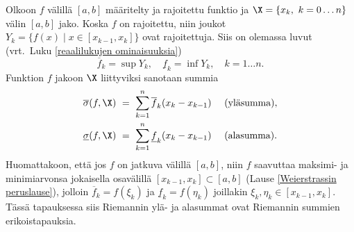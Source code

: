 Olkoon $f$ välillä $[a,b]$ määritelty ja rajoitettu funktio ja $\X = \{x_k,\ k = 0 \ldots n\}$
välin $[a,b]$ jako. Koska $f$ on rajoitettu, niin joukot 
$Y_k = \{f(x) \mid x \in [x_{k-1},x_k]\}$ ovat rajoitettuja. Siis on olemassa luvut 
(vrt.\ Luku \ref{reaalilukujen ominaisuuksia})
\[ 
\overline{f}_k = \sup Y_k, \quad \underline{f}_k = \inf Y_k, \quad k = 1 \ldots n.  
\]
Funktion $f$ jakoon $\X$ liittyviksi
%
 sanotaan summia
\begin{align*}
\overline{\sigma}(f,\X)\ 
          &=\ \sum_{k=1}^n \overline{f}_k (x_k-x_{k-1}) \quad\ \text{(yläsumma)}, \\
\underline{\sigma}(f,\X)\ 
          &=\ \sum_{k=1}^n \underline{f}_k (x_k-x_{k-1}) \quad\ \text{(alasumma)}. 
\end{align*}
Huomattakoon, että jos $f$ on jatkuva välillä $[a,b]$, niin $f$ saavuttaa maksimi- ja 
minimiarvonsa jokaisella osavälillä $[x_{k-1},x_k]\subset[a,b]$ 
(Lause \ref{Weierstrassin peruslause}), jolloin $\overline{f}_k=f(\xi_k)$ ja 
$\underline{f}_k=f(\eta_k)$ joillakin $\xi_k,\eta_k\in[x_{k-1},x_k]$. Tässä tapauksessa siis
Riemannin ylä- ja alasummat ovat Riemannin summien erikoistapauksia.


